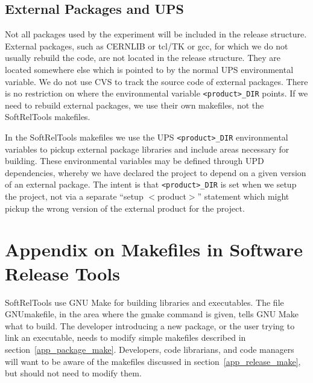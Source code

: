 \subsection{External Packages and UPS}
Not all packages used by the experiment will be included in the release 
structure. External packages, such as CERNLIB or tcl/TK or gcc, for which we 
do not usually rebuild the code, are not located in the release structure.  
They are located somewhere else which is pointed to by the normal UPS 
environmental variable.  We do not use CVS to track the source code of external 
packages. There is no restriction on where the environmental variable 
\texttt{<product>\_DIR} points. If we need to rebuild external packages, we
use their own makefiles, not the SoftRelTools makefiles.

In the SoftRelTools makefiles we use the UPS \texttt{<product>\_DIR} 
environmental variables
to pickup external package libraries and include areas necessary for building.
These environmental variables may be defined through UPD dependencies, whereby
we have declared the project to depend on a given version of an external 
package. The intent is that \texttt{<product>\_DIR} is set when we setup the
project, not via a separate ``setup $<$product$>$'' statement which might 
pickup the wrong version of the external product for the project.

\section{Appendix on Makefiles in Software Release Tools}
\label{app_make}

SoftRelTools use GNU Make for building libraries and executables.
The file GNUmakefile, in the area where the gmake command
is given, tells GNU Make what to build.
The developer introducing a new package, or the user trying to link an
executable, needs to modify simple
makefiles described in section~\ref{app_package_make}.  Developers, code
librarians, and code managers will want to be aware of the
makefiles discussed in section~\ref{app_release_make}, but should
not need to modify them.   

